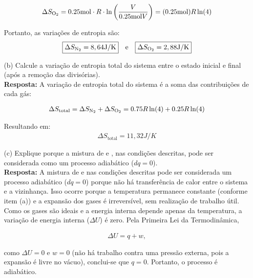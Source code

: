     \begin{align*}
        \Delta S_{\ce{O2}} = \num{0,25}\unit{mol} \cdot R \cdot
        \ln\left(\frac{V}{\num{0,25}\unit{mol}V}\right) = (\num{0,25}\unit{mol})R\ln(4)
    \end{align*}
    
    Portanto, as variações de entropia são:
    \begin{align*}
        \boxed{\Delta S_{\ce{N2}} = 8,64\unit{J\per K}} \quad \text{e} \quad
        \boxed{\Delta S_{\ce{O2}} = 2,88\unit{J\per K}}
    \end{align*}

(b) Calcule a variação de entropia total do sistema entre o estado inicial e
final (após a remoção das divisórias).\\

    \textbf{Resposta:} A variação de entropia total do sistema é a soma das contribuições de cada gás:

    \begin{align*}
    \Delta S_{\text{total}} = \Delta S_{\ce{N2}} + \Delta S_{\ce{O2}} =
    \num{0,75}R\ln(4) + \num{0,25}R\ln(4) 
    \end{align*}
    
    Resultando em:
    \begin{align*}
        \boxed{\Delta S_{\text{total}} = 11,32\unit{J \per K}}
    \end{align*}

(c) Explique porque a mistura de  e , nas condições descritas,
pode ser considerada como um processo adiabático (\(dq= 0\)).\\

    \textbf{Resposta:} A mistura de  e  nas condições descritas pode 
    ser considerada um processo adiabático (\(dq = 0\)) porque não há transferência 
    de calor entre o sistema e a vizinhança. Isso ocorre porque a temperatura 
    permanece constante (conforme item (a)) e a expansão dos gases é irreversível, 
    sem realização de trabalho útil. Como os gases são ideais e a energia interna 
    depende apenas da temperatura, a variação de energia interna (\(\Delta U\)) é zero. 
    Pela Primeira Lei da Termodinâmica,

    \begin{align*}
    \Delta U = q + w,
    \end{align*}

    como \(\Delta U = 0\) e \(w = 0\) (não há trabalho contra uma pressão externa, 
    pois a expansão é livre no vácuo), conclui-se que \(q = 0\). Portanto, o processo 
    é adiabático.\\ 

